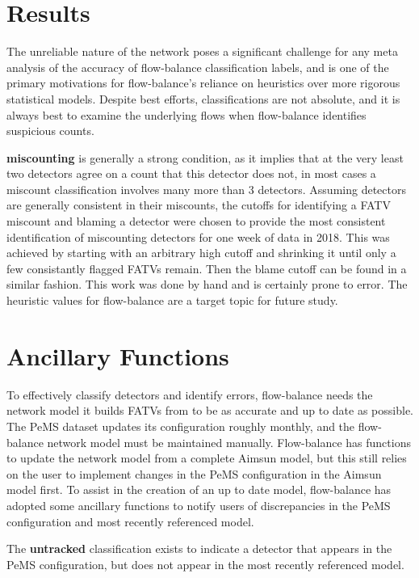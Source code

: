 \documentclass[titlepage]{article}
\begin{document}
\section{Results}\label{results}
The unreliable nature of the network poses a significant challenge for any meta analysis of the accuracy of flow-balance classification labels, and is one of the primary motivations for flow-balance's reliance on heuristics over more rigorous statistical models. Despite best efforts, classifications are not absolute, and it is always best to examine the underlying flows when flow-balance identifies suspicious counts.

\textbf{miscounting} is generally a strong condition, as it implies that at the very least two detectors agree on a count that this detector does not, in most cases a miscount classification involves many more than 3 detectors. Assuming detectors are generally consistent in their miscounts, the cutoffs for identifying a FATV miscount and blaming a detector were chosen to provide the most consistent identification of miscounting detectors for one week of data in 2018. This was achieved by starting with an arbitrary high cutoff and shrinking it until only a few consistantly flagged FATVs remain. Then the blame cutoff can be found in a similar fashion. This work was done by hand and is certainly prone to error. The heuristic values for flow-balance are a target topic for future study.

\section{Ancillary Functions}\label{ancillary}
To effectively classify detectors and identify errors, flow-balance needs the network model it builds FATVs from to be as accurate and up to date as possible. The PeMS dataset updates its configuration roughly monthly, and the flow-balance network model must be maintained manually. Flow-balance has functions to update the network model from a complete Aimsun model, but this still relies on the user to implement changes in the PeMS configuration in the Aimsun model first. To assist in the creation of an up to date model, flow-balance has adopted some ancillary functions to notify users of discrepancies in the PeMS configuration and most recently referenced model.

The \textbf{untracked} classification exists to indicate a detector that appears in the PeMS configuration, but does not appear in the most recently referenced model.
\end{document}

